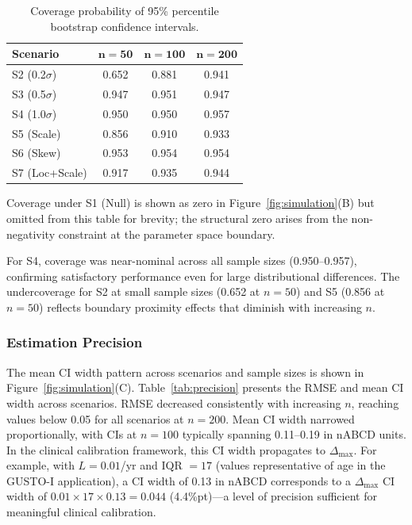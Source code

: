 \documentclass[AMA,Times1COL]{WileyNJDv5}
\begin{document}
\begin{table}[ht]
\centering
\caption{Coverage probability of 95\% percentile bootstrap confidence intervals.\label{tab:coverage}}
\begin{tabular}{lccc}
\toprule
\textbf{Scenario} & $\boldsymbol{n=50}$ & $\boldsymbol{n=100}$ & $\boldsymbol{n=200}$ \\
\midrule
S2 (0.2$\sigma$) & 0.652 & 0.881 & 0.941 \\
S3 (0.5$\sigma$) & 0.947 & 0.951 & 0.947 \\
S4 (1.0$\sigma$) & 0.950 & 0.950 & 0.957 \\
S5 (Scale) & 0.856 & 0.910 & 0.933 \\
S6 (Skew) & 0.953 & 0.954 & 0.954 \\
S7 (Loc+Scale) & 0.917 & 0.935 & 0.944 \\
\bottomrule
\end{tabular}
\begin{tablenotes}
\item Coverage under S1 (Null) is shown as zero in Figure~\ref{fig:simulation}(B) but omitted from this table for brevity; the structural zero arises from the non-negativity constraint at the parameter space boundary.
\item For S4, coverage was near-nominal across all sample sizes (0.950--0.957), confirming satisfactory performance even for large distributional differences. The undercoverage for S2 at small sample sizes (0.652 at $n=50$) and S5 (0.856 at $n=50$) reflects boundary proximity effects that diminish with increasing $n$.
\end{tablenotes}
\end{table}

\subsubsection{Estimation Precision}

The mean CI width pattern across scenarios and sample sizes is shown in Figure~\ref{fig:simulation}(C). Table~\ref{tab:precision} presents the RMSE and mean CI width across scenarios. RMSE decreased consistently with increasing $n$, reaching values below 0.05 for all scenarios at $n = 200$. Mean CI width narrowed proportionally, with CIs at $n = 100$ typically spanning 0.11--0.19 in nABCD units. In the clinical calibration framework, this CI width propagates to $\Delta_{\max}$. For example, with $L = 0.01$/yr and IQR $= 17$ (values representative of age in the GUSTO-I application), a CI width of 0.13 in nABCD corresponds to a $\Delta_{\max}$ CI width of $0.01 \times 17 \times 0.13 = 0.044$ (4.4\%pt)---a level of precision sufficient for meaningful clinical calibration.
\end{document}
